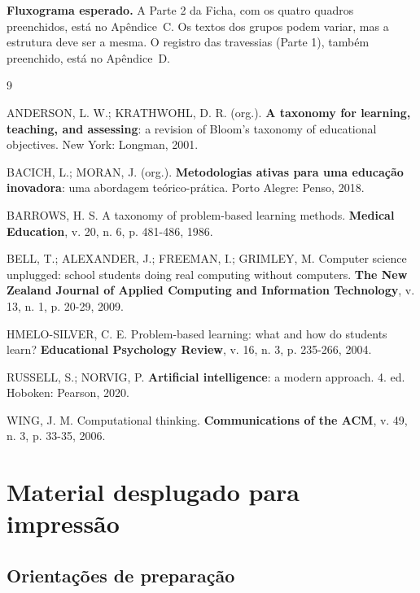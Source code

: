 \documentclass[12pt,a4paper]{article}
\begin{document}
\textbf{Fluxograma esperado.} A Parte 2 da Ficha, com os quatro quadros
preenchidos, está no Apêndice~C. Os textos dos grupos podem variar, mas a
estrutura deve ser a mesma. O registro das travessias (Parte 1), também preenchido, está no
Apêndice~D.

\begingroup\footnotesize{}
\begin{thebibliography}{9}

ANDERSON, L. W.; KRATHWOHL, D. R. (org.). \textbf{A taxonomy for learning,
teaching, and assessing}: a revision of Bloom's taxonomy of educational
objectives. New York: Longman, 2001.

BACICH, L.; MORAN, J. (org.). \textbf{Metodologias ativas para uma educação
inovadora}: uma abordagem teórico-prática. Porto Alegre: Penso, 2018.

BARROWS, H. S. A taxonomy of problem-based learning methods.
\textbf{Medical Education}, v. 20, n. 6, p. 481-486, 1986.

BELL, T.; ALEXANDER, J.; FREEMAN, I.; GRIMLEY, M. Computer science unplugged:
school students doing real computing without computers. \textbf{The New Zealand
Journal of Applied Computing and Information Technology}, v. 13, n. 1,
p. 20-29, 2009.

HMELO-SILVER, C. E. Problem-based learning: what and how do students learn?
\textbf{Educational Psychology Review}, v. 16, n. 3, p. 235-266, 2004.

RUSSELL, S.; NORVIG, P. \textbf{Artificial intelligence}: a modern approach.
4. ed. Hoboken: Pearson, 2020.

WING, J. M. Computational thinking. \textbf{Communications of the ACM}, v. 49,
n. 3, p. 33-35, 2006.

\end{thebibliography}
\endgroup

\appendix
\clearpage
\section{Material desplugado para impressão}

\subsection{Orientações de preparação}
\end{document}
